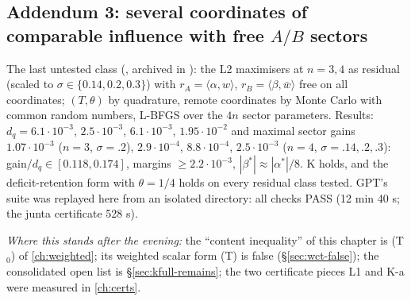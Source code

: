 \subsection{Addendum 3: several coordinates of comparable influence with free $A/B$ sectors}
The last untested class (, archived in ): the L2 maximisers at $n=3,4$ as residual (scaled to $\sigma\in\{0.14,0.2,0.3\}$) with $r_A=\langle\alpha,w\rangle$,
$r_B=\langle\beta,\bar w\rangle$ free on all coordinates; $(T,\theta)$ by quadrature, remote coordinates by Monte Carlo with common random numbers, L-BFGS over the $4n$ sector parameters.
Results: $d_q=6.1\cdot10^{-3}$, $2.5\cdot10^{-3}$, $6.1\cdot10^{-3}$, $1.95\cdot10^{-2}$ and maximal sector gains $1.07\cdot10^{-3}$ ($n=3$, $\sigma=.2$), $2.9\cdot10^{-4}$, $8.8\cdot10^{-4}$, $2.5\cdot10^{-3}$
($n=4$, $\sigma=.14,.2,.3$): gain$/d_q\in[0.118,0.174]$, margins $\ge2.2\cdot10^{-3}$, $|\beta^*|\approx|\alpha^*|/8$. K holds, and the deficit-retention form with $\theta=1/4$ holds on every residual
class tested. GPT's  suite was replayed here from an isolated directory: all checks PASS (12 min 40 s; the junta certificate 528 s).

\emph{Where this stands after the evening:} the ``content inequality'' of this chapter is (T$_0$) of \autoref{ch:weighted}; its weighted scalar form (T) is false (\S\ref{sec:wct-false}); the
consolidated open list is \S\ref{sec:kfull-remains}; the two certificate pieces L1 and K-a were measured in \autoref{ch:certs}.
